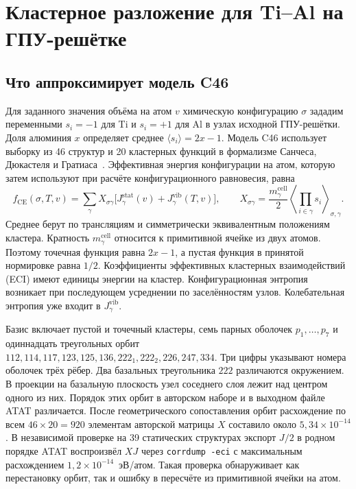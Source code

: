 \section{Кластерное разложение для Ti--Al на ГПУ-решётке}
\label{sec:ce-model}

\subsection{Что аппроксимирует модель C46}

Для заданного значения объёма на атом \(v\) химическую конфигурацию
\(\sigma\) зададим переменными \(s_i=-1\) для Ti и \(s_i=+1\) для Al
в узлах исходной ГПУ-решётки. Доля алюминия \(x\) определяет среднее
\(\langle s_i\rangle=2x-1\). Модель C46 использует выборку из 46
структур и 20 кластерных функций в формализме Санчеса, Дюкастеля и
Гратиаса~\cite{sanchez1984}. Эффективная энергия конфигурации на
атом, которую затем используют при расчёте конфигурационного равновесия, равна
\begin{equation}
 f_{\mathrm{CE}}(\sigma,T,v)
 =\sum_{\gamma}X_{\sigma\gamma}
 \bigl[J_\gamma^{\mathrm{stat}}(v)+
 J_\gamma^{\mathrm{vib}}(T,v)\bigr],
 \qquad
 X_{\sigma\gamma}=\frac{m_\gamma^{\mathrm{cell}}}{2}
 \left\langle\prod_{i\in\gamma}s_i\right\rangle_{\sigma,\gamma}.
 \label{eq:ce-model-normalization}
\end{equation}
Среднее берут по трансляциям и симметрически эквивалентным положениям
кластера. Кратность \(m_\gamma^{\mathrm{cell}}\) относится к примитивной
ячейке из двух атомов. Поэтому точечная функция равна \(2x-1\), а пустая
функция в принятой нормировке равна \(1/2\). Коэффициенты эффективных
кластерных взаимодействий (ECI) имеют единицы энергии на кластер.
Конфигурационная энтропия возникает при последующем усреднении по
заселённостям узлов. Колебательная энтропия уже входит в
\(J_\gamma^{\mathrm{vib}}\).

Базис включает пустой и точечный кластеры, семь парных оболочек
\(p_1,\ldots,p_7\) и одиннадцать треугольных орбит
\(112,114,117,123,125,136,222_1,222_2,226,247,334\).
Три цифры указывают номера оболочек трёх рёбер. Два базальных треугольника
\(222\) различаются окружением. В проекции на базальную плоскость
узел соседнего слоя лежит над центром одного из них. Порядок этих орбит в
авторском наборе и в выходном файле ATAT различается. После геометрического
сопоставления орбит расхождение по всем \(46\times20=920\) элементам
авторской матрицы \(X\) составило около \(5{,}34\times10^{-14}\). В
независимой проверке на 39 статических структурах экспорт \(J/2\) в
родном порядке ATAT воспроизвёл \(XJ\) через \texttt{corrdump -eci}
с максимальным расхождением \(1{,}2\times10^{-14}\)~эВ/атом. Такая
проверка обнаруживает как перестановку орбит, так и ошибку в пересчёте
из примитивной ячейки на атом.

